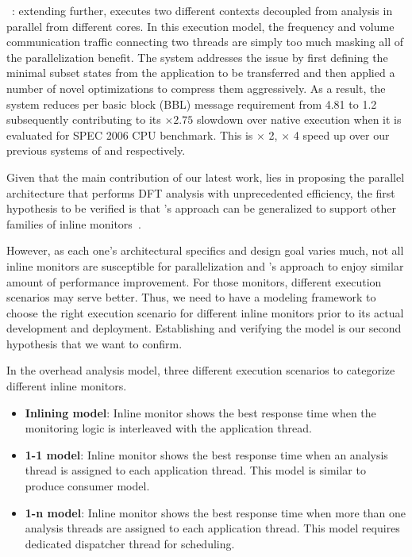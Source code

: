{\bf \sreplica}~\cite{sreplica:ccs2013}: extending \tfa further, \sreplica
executes two different contexts decoupled from \tfa analysis in parallel from
different cores. In this execution model, the frequency and volume
communication traffic connecting two threads are simply too much masking all of
the parallelization benefit. The system addresses the issue by first defining
the minimal subset states from the application to be transferred and then
applied a number of novel optimizations to compress them aggressively. As a
result, the system reduces per basic block (BBL) message requirement from 4.81
to 1.2 subsequently contributing to its $\times 2.75$ slowdown over native
execution when it is evaluated for SPEC 2006 CPU benchmark. This is $\times$ 2,
$\times$ 4 speed up over our previous systems of \libdft and \tfa respectively.

%
%
Given that the main contribution of our latest work, \sreplica lies in
proposing the parallel architecture that performs DFT analysis with
unprecedented efficiency, the first hypothesis to be verified is that
\sreplica's approach can be generalized to support other families of inline
monitors~\cite{cab:oopsala2009}. 

However, as each one's architectural specifics and design goal varies much, not
all inline monitors are susceptible for parallelization and \sreplica's
approach to enjoy similar amount of performance improvement. For those
monitors, different execution scenarios may serve better. Thus, we need to have
a modeling framework to choose the right execution scenario for different
inline monitors prior to its actual development and deployment. Establishing
and verifying the model is our second hypothesis that we want to confirm.

In the overhead analysis model, three different execution scenarios to
categorize different inline monitors. 

\begin{itemize}

    \item {\bf Inlining model}: Inline monitor shows the best response time
            when the monitoring logic is interleaved with the application
            thread.

    \item {\bf 1-1 model}: Inline monitor shows the best response time when an
            analysis thread is assigned to each application thread. This model
            is similar to produce consumer model.

    \item {\bf 1-n model}: Inline monitor shows the best response time when
            more than one analysis threads are assigned to each application
            thread.  This model requires dedicated dispatcher thread for
            scheduling.
    \end{itemize}


